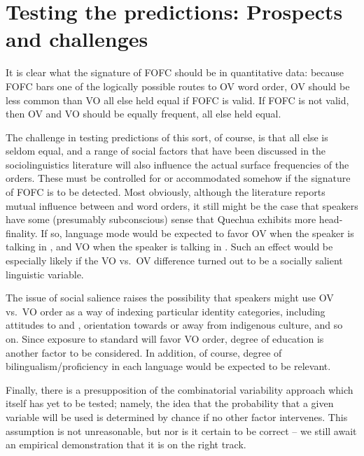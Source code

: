 \documentclass[output=paper]{langsci/langscibook}
\begin{document}
\section{Testing the predictions: Prospects and challenges}\label{sec-30:key:3}\largerpage

It is clear what the signature of \gls{FOFC} should be in quantitative data: because
FOFC bars one of the logically possible routes to OV word order, OV should be
less common than VO all else held equal if \gls{FOFC} is valid.  If \gls{FOFC} is not
valid, then OV and VO should be equally frequent, all else held equal.

The challenge in testing predictions of this sort, of course, is that all else
is seldom equal, and a range of social factors that have been discussed in the
sociolinguistics literature will also influence the actual surface frequencies
of the orders.  These must be controlled for or accommodated somehow if the
signature of \gls{FOFC} is to be detected.  Most obviously, although the literature
reports mutual influence between  and  word orders, it still
might be the case that speakers have some (presumably subconscious) sense that
Quechua exhibits more head-finality. If so, language mode would be expected to
favor OV when the speaker is talking in , and VO when the speaker is
talking in .  Such an effect would be especially likely if the VO vs.\ OV
difference turned out to be a socially salient linguistic variable.

The issue of social salience raises the possibility that speakers might use OV
vs.\ VO order as a way of indexing particular identity categories, including
attitudes to  and , orientation towards or away from indigenous
culture, and so on.  Since exposure to standard  will favor VO order,
degree of education is another factor to be considered. In addition, of course,
degree of bilingualism/proficiency in each language would be expected to be
relevant.

Finally, there is a presupposition of the combinatorial variability approach
which itself has yet to be tested;  namely, the idea that the probability that
a given variable will be used is determined by chance if no other factor
intervenes.  This assumption is not unreasonable, but nor is it certain to be
correct -- we still await an empirical demonstration that it is on the right
track.
\end{document}
